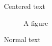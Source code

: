 \documentclass{article}
\begin{document}
\begin{center}
Centered text
\end{center}
\begin{figure}
\caption{A figure}
\end{figure}
Normal text
\end{document}
